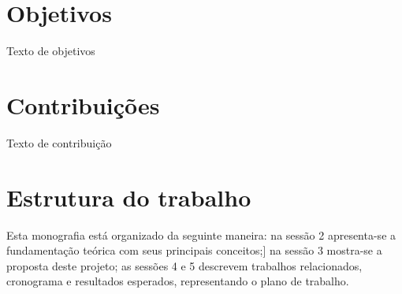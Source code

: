 \section{Objetivos}

Texto de objetivos

\section{Contribuições}

Texto de contribuição

\section{Estrutura do trabalho}

Esta monografia está organizado da seguinte maneira: na sessão 2 apresenta-se a fundamentação teórica com seus principais conceitos;]
na sessão 3 mostra-se a proposta deste projeto; as sessões 4 e 5 descrevem trabalhos relacionados, cronograma e resultados esperados,
representando o plano de trabalho.






